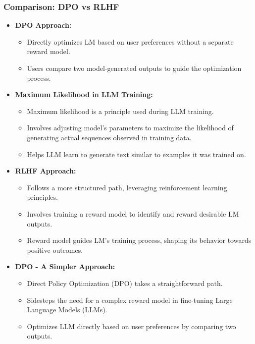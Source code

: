 \begin{frame}[fragile]\frametitle{Comparison: DPO vs RLHF}
  \begin{itemize}
    \item \textbf{DPO Approach:}
      \begin{itemize}
        \item Directly optimizes LM based on user preferences without a separate reward model.
        \item Users compare two model-generated outputs to guide the optimization process.
      \end{itemize}

    \item \textbf{Maximum Likelihood in LLM Training:}
      \begin{itemize}
        \item Maximum likelihood is a principle used during LLM training.
        \item Involves adjusting model's parameters to maximize the likelihood of generating actual sequences observed in training data.
        \item Helps LLM learn to generate text similar to examples it was trained on.
      \end{itemize}
    \item \textbf{RLHF Approach:}
      \begin{itemize}
        \item Follows a more structured path, leveraging reinforcement learning principles.
        \item Involves training a reward model to identify and reward desirable LM outputs.
        \item Reward model guides LM's training process, shaping its behavior towards positive outcomes.
      \end{itemize}
    \item \textbf{DPO - A Simpler Approach:}
      \begin{itemize}
        \item Direct Policy Optimization (DPO) takes a straightforward path.
        \item Sidesteps the need for a complex reward model in fine-tuning Large Language Models (LLMs).
        \item Optimizes LLM directly based on user preferences by comparing two outputs.
      \end{itemize}
  \end{itemize}
\end{frame}


